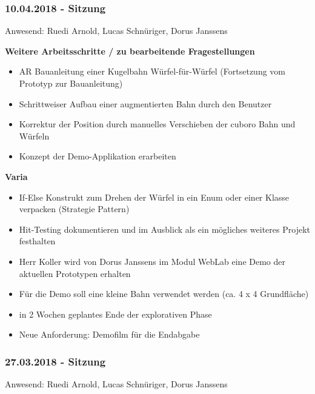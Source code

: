 \subsubsection*{10.04.2018 - Sitzung}

Anwesend: Ruedi Arnold, Lucas Schnüriger, Dorus Janssens

\textbf{Weitere Arbeitsschritte / zu bearbeitende Fragestellungen}
\begin{itemize}
	\item AR Bauanleitung einer Kugelbahn Würfel-für-Würfel (Fortsetzung vom Prototyp zur Bauanleitung)
	\item Schrittweiser Aufbau einer augmentierten Bahn durch den Benutzer
	\item Korrektur der Position durch manuelles Verschieben der cuboro Bahn und Würfeln
	\item Konzept der Demo-Applikation erarbeiten
\end{itemize}

\textbf{Varia}
\begin{itemize}
	\item If-Else Konstrukt zum Drehen der Würfel in ein Enum oder einer Klasse verpacken (Strategie Pattern)
	\item Hit-Testing dokumentieren und im Ausblick als ein mögliches weiteres Projekt festhalten 
	\item Herr Koller wird von Dorus Janssens im Modul WebLab eine Demo der aktuellen Prototypen erhalten
	\item Für die Demo soll eine kleine Bahn verwendet werden (ca. 4 x 4 Grundfläche)
	\item in 2 Wochen geplantes Ende der explorativen Phase
	\item Neue Anforderung: Demofilm für die Endabgabe
\end{itemize}


\subsubsection*{27.03.2018 - Sitzung}

Anwesend: Ruedi Arnold, Lucas Schnüriger, Dorus Janssens

